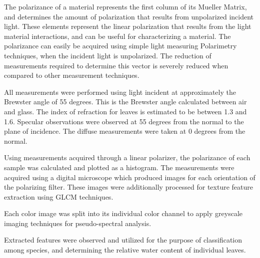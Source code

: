 The polarizance of a material represents the first column of its Mueller Matrix, and determines the amount of polarization that results from unpolarized incident light.  These elements represent the linear polarization that results from the light material interactions, and can be useful for characterizing a material.  The polarizance can easily be acquired using simple light measuring Polarimetry techniques, when the incident light is unpolarized.  The reduction of measurements required to determine this vector is severely reduced when compared to other measurement techniques.

All measurements were performed using light incident at approximately the Brewster angle of 55 degrees.  This is the Brewster angle calculated between air and glass.  The index of refraction for leaves is estimated to be between 1.3 and 1.6. Specular observations were observed at 55 degrees from the normal to the plane of incidence.  The diffuse measurements were taken at 0 degrees from the normal.

Using measurements acquired through a linear polarizer, the polarizance of each sample was calculated and plotted as a histogram.  The measurements were acquired using a digital microscope which produced images for each orientation of the polarizing filter.  These images were additionally processed for texture feature extraction using GLCM techniques.

Each color image was split into its individual color channel to apply greyscale imaging techniques for pseudo-spectral analysis.

Extracted features were observed and utilized for the purpose of classification among species, and determining the relative water content of individual leaves.
